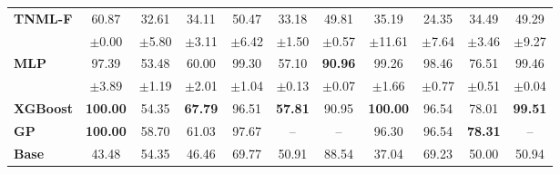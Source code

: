 \begin{table}[ht]
\begin{tabular}{lcccccccccc}
\midrule
\textbf{TNML-F} & 60.87 & 32.61 & 34.11 & 50.47 & 33.18 & 49.81 & 35.19 & 24.35 & 34.49 & 49.29 \\
 & $\pm$0.00 & $\pm$5.80 & $\pm$3.11 & $\pm$6.42 & $\pm$1.50 & $\pm$0.57 & $\pm$11.61 & $\pm$7.64 & $\pm$3.46 & $\pm$9.27 \\
\midrule
\midrule
\textbf{MLP} & 97.39 & 53.48 & 60.00 & 99.30 & 57.10 & \textbf{90.96} & 99.26 & 98.46 & 76.51 & 99.46 \\
 & $\pm$3.89 & $\pm$1.19 & $\pm$2.01 & $\pm$1.04 & $\pm$0.13 & $\pm$0.07 & $\pm$1.66 & $\pm$0.77 & $\pm$0.51 & $\pm$0.04 \\
\midrule
\textbf{XGBoost} & \textbf{100.00} & 54.35 & \textbf{67.79} & 96.51 & \textbf{57.81} & 90.95 & \textbf{100.00} & 96.54 & 78.01 & \textbf{99.51} \\
\midrule
\textbf{GP} & \textbf{100.00} & 58.70 & 61.03 & 97.67 & -- & -- & 96.30 & 96.54 & \textbf{78.31} & -- \\
\midrule
\textbf{Base} & 43.48 & 54.35 & 46.46 & 69.77 & 50.91 & 88.54 & 37.04 & 69.23 & 50.00 & 50.94 \\
\bottomrule
\end{tabular}
\end{table}